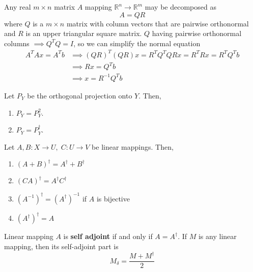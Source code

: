   \begin{theorem}[QR Decomposition]
    Any real $m \times n$ matrix $A$ mapping $\mathbb{R}^n \longrightarrow \mathbb{R}^m$ may be decomposed as
    \begin{equation}
      A = QR
    \end{equation}
    where $Q$ is a $m \times n$ matrix with column vectors that are pairwise orthonormal and $R$ is an upper triangular square matrix. $Q$ having pairwise orthonormal columns $\implies Q^T Q = I$, so we can simplify the normal equation
    \begin{align*}
      A^T A x = A^T b & \implies (Q R)^T (Q R) x = R^T Q^T Q R x = R^T R x = R^T Q^T b \\
      & \implies R x = Q^T b \\
      & \implies x = R^{-1} Q^T b
    \end{align*}
  \end{theorem}

  \begin{theorem}
    Let $P_Y$ be the orthogonal projection onto $Y$. Then, 
    \begin{enumerate}
      \item $P_Y = P_Y^2$. 
      \item $P_Y = P_Y^\dagger$. 
    \end{enumerate}
  \end{theorem}

  \begin{theorem} Let $A, B: X \longrightarrow U, \; C: U \longrightarrow V$ be linear mappings. Then, 
    \begin{enumerate}
      \item $(A + B)^\dagger = A^\dagger + B^\dagger$
      \item $(C A)^\dagger = A^\dagger C^\dagger$
      \item $(A^{-1})^\dagger = (A^\dagger)^{-1}$ if $A$ is bijective
      \item $(A^\dagger)^\dagger = A$
    \end{enumerate}
  \end{theorem}

  \begin{definition}
    Linear mapping $A$ is \textbf{self adjoint} if and only if $A = A^\dagger$. If $M$ is any linear mapping, then its self-adjoint part is 
    \begin{equation}
      M_\delta = \frac{M + M^\dagger}{2}
    \end{equation}
  \end{definition}

